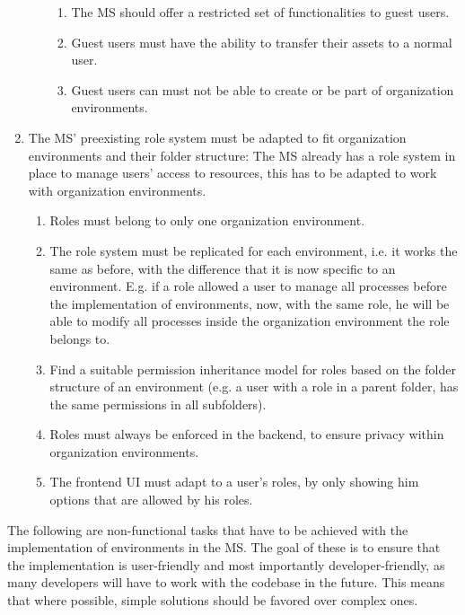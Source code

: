 \begin{enumerate}
\begin{enumerate}
\begin{enumerate}
			            \item The MS should offer a restricted set of functionalities to guest
			                  users.

			            \item Guest users must have the ability to transfer their assets to a normal user.

			            \item Guest users can must not be able to create or be part of organization environments.
		            \end{enumerate}

	      \end{enumerate}


	\item The MS' preexisting role system must be adapted to fit organization environments
	      and their folder structure:
	      The MS already has a role system in place to manage users' access to resources,
	      this has to be adapted to work with organization environments.
	      \begin{enumerate}
		      \item Roles must belong to only one organization environment.
		      \item The role system must be replicated for each environment, i.e. it works the
		            same as before, with the difference that it is now specific to an environment.
		            E.g. if a role allowed a user to manage all processes before the implementation of
		            environments, now, with the same role, he will be able to modify all processes
		            inside the organization environment the role belongs to.
		      \item Find a suitable permission inheritance model for roles based on the folder
		            structure of an environment (e.g. a user with a role in a parent
		            folder, has the same permissions in all subfolders).

		      \item Roles must always be enforced in the backend, to ensure privacy within
		            organization environments.

		      \item The frontend UI must adapt to a user's roles, by only showing him options that
		            are allowed by his roles.
	      \end{enumerate}
\end{enumerate}

The following are non-functional tasks that have to be achieved with the implementation
of environments in the MS.
The goal of these is to ensure that the implementation is user-friendly and most
importantly developer-friendly, as many developers will have to work with the codebase in
the future.
This means that where possible, simple solutions should be favored over complex ones.

